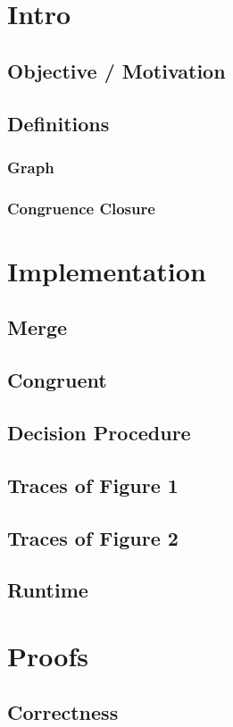 \documentclass[12pt]{article}
\begin{document}
\section{Intro}

\subsection{Objective / Motivation}

\subsection{Definitions}

\subsubsection{Graph}
\subsubsection{Congruence Closure}

\section{Implementation}

\subsection{Merge}
\subsection{Congruent}
\subsection{Decision Procedure}
\subsection{Traces of Figure 1}
\subsection{Traces of Figure 2}
\subsection{Runtime}

\section{Proofs}

\subsection{Correctness}
\end{document}
